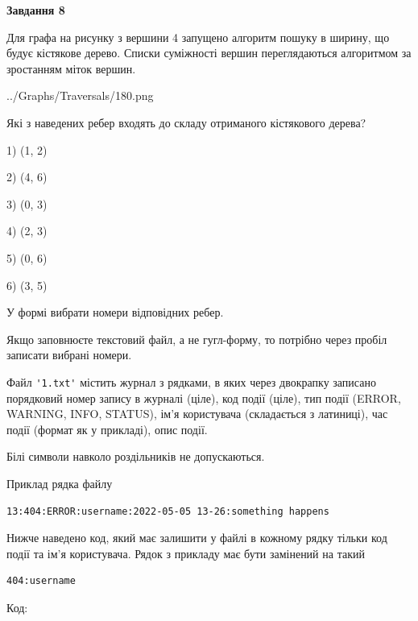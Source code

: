 \documentclass[12pt, ukrainian]{article}
\def\code#1{\Verb!#1!}
\begin{document}
{\begin {large}
{\begin {center}\textbf{Завдання 8}\end {center}}\par
Для графа на рисунку з вершини 4 запущено алгоритм пошуку в ширину, що будує кістякове дерево. Списки суміжності вершин переглядаються алгоритмом за зростанням міток вершин.\par
\begin{center}
	{../Graphs/Traversals/180.png}
\end{center}
\par Які з наведених ребер входять до складу отриманого кістякового дерева?\par
1) (1, 2)\par
2) (4, 6)\par
3) (0, 3)\par
4) (2, 3)\par
5) (0, 6)\par
6) (3, 5)\par
{\vskip 15pt} У формі вибрати номери відповідних ребер.


Якщо заповнюєте текстовий файл, а не гугл-форму, то потрібно через пробіл записа\-ти вибрані номери.\par
\newpage


Файл \code{'1.txt'} містить журнал з рядками, в яких через двокрапку записано поряд\-ко\-вий номер запису в журналі (ціле), код події (ціле), тип події (ERROR, \\WARNING, INFO, STATUS), ім'я користувача (складається з латиниці), час події (фор\-мат як у прикладі), опис події.

Білі символи навколо роздільників не допускаються.

Приклад рядка файлу



\begin{verbatim}
13:404:ERROR:username:2022-05-05 13-26:something happens
\end{verbatim}


Нижче наведено код, який має залишити у файлі в кожному рядку тільки код події та ім'я користувача. Рядок з прикладу має бути замінений на такий



\begin{verbatim}
404:username
\end{verbatim}




Код:




\end{large}}
\end{document}
